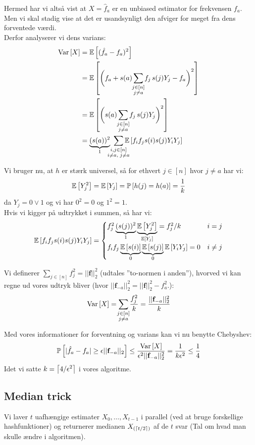 Hermed har vi altså vist at $X = \hat f_a$ er en unbiased estimator for frekvensen $f_a$. Men vi skal stadig vise at det er usandsynligt den afviger for meget fra dens forventede værdi.\\


Derfor analyserer vi dens varians:
\begin{align*}
  \Var{X}
  &= \E{(\hat f_a - f_a)^2}\\
  &= \E{\pbigg{ f_a + s(a) \summ{j \in [n]\\ j \neq a} f_j \, s(j) Y_j - f_a}^2 }\\
  &= \E{\pbigg{ s(a) \summ{j \in [n]\\ j \neq a} f_j \, s(j) Y_j }^2 }\\
  &= \underbrace{(s(a))^2}_{1} \ \summ{i, j \in [n]\\i \neq a, \; j \neq a} \E{ f_i f_j s(i) s(j) Y_i Y_j }
\end{align*}

Vi bruger nu, at $h$ er stærk universel, så for ethvert $j \in [n]$ hvor $j \neq a$ har vi:
$$
\mathbb{E} \left[  Y_j^2  \right] = \mathbb{E} \left[  Y_j  \right] = \mathbb{P} \left[  h(j) = h(a)  \right] = \frac{1}{k}
$$
da $Y_j = 0 \lor 1$ og vi har $0^2 = 0$ og $1^2 = 1$.\\

Hvis vi kigger på udtrykket i summen, så har vi:
$$
\mathbb{E} \left[   f_i f_j s(i) s(j) Y_i Y_j   \right] =
\begin{cases}
	f_j^2 \underbrace{(s(j))^2}_{1} \underbrace{\mathbb{E} \left[  Y_j^2  \right]}_{\mathbb{E} \left[  Y_j  \right]} = f_j^2 / k & i = j\\
  f_i f_j \underbrace{\mathbb{E} \left[  s(i)  \right]}_{0} \underbrace{\mathbb{E} \left[  s(j)  \right]}_{0} \mathbb{E} \left[  Y_i Y_j  \right] = 0 & i \neq j
\end{cases}
$$

Vi definerer $\sum_{j \in [n]} f_j^2 = || \mathbf f ||_2^2$ (udtales ''to-normen i anden''), hvorved vi kan regne ud vores udtryk bliver (hvor $|| \mathbf f_{-a} ||_2^2 = || \mathbf f ||_2^2 - f_a^2$.):
$$
\Var{X} = \summ{j \in [n]\\ j \neq a} \frac{f_j^2}{k} = \frac{|| \mathbf f_{-a} ||_2^2}{k}
$$

Med vores informationer for forventning og varians kan vi nu benytte Chebyshev:
$$
\mathbb{P} \left[  |\hat f_a - f_a| \geq \epsilon || \mathbf f_{-a} ||_2  \right]
\leq \frac{\text{Var} \left[  X  \right]}{\epsilon^2 ||\mathbf f_{-a}||_2^2}
= \frac{1}{k \epsilon^2}
\leq \frac{1}{4}
$$
Idet vi satte $k = \left\lceil 4 / \epsilon^2 \right\rceil$ i vores algoritme.


\subsection{Median trick}
Vi laver $t$ uafhængige estimater $X_0, \dots, X_{t-1}$ i parallel (ved at bruge forskellige hashfunktioner) og returnerer medianen $X_{(\left\lceil t/2 \right\rceil)}$ af de $t$ svar (Tal om hvad man skulle ændre i algoritmen).\\

